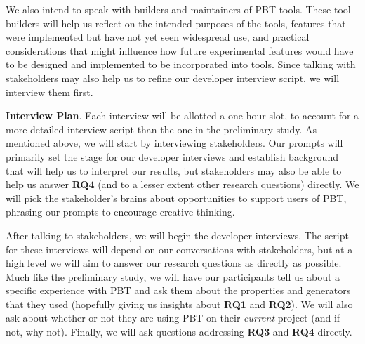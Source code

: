 We also intend to speak with builders and maintainers of PBT tools. These
tool-builders will help us reflect on the intended purposes of the tools,
features that were implemented but have not yet seen widespread use, and
practical considerations that might influence how future experimental features
would have to be designed and implemented to be incorporated into tools. Since talking with
stakeholders may also help us to refine our developer interview script, we will
interview them first.



\textbf{Interview Plan}.
Each interview will be allotted a one hour slot, to account for a more detailed
interview script than the one in the preliminary study. As mentioned above, we
will start by interviewing stakeholders. Our prompts will primarily set the
stage for our developer interviews and establish background that will help us to
interpret our results, but stakeholders may also be able to help us answer {\bf
RQ4} (and to a lesser extent other research questions) directly. We will pick
the stakeholder's brains about opportunities to support users
of PBT, phrasing our prompts to encourage creative thinking.

After talking to stakeholders, we will begin the developer interviews. The
script for these interviews will depend on our conversations with stakeholders,
but at a high level we will aim to answer our research questions as directly as
possible. Much like the preliminary study, we will have our participants tell us about a
specific experience with PBT and ask them about the properties and generators
that they used (hopefully giving us insights about {\bf RQ1} and {\bf RQ2}).  We
will also ask about whether or not they are using PBT on their {\em current}
project (and if not, why not). Finally, we will ask questions addressing
{\bf RQ3} and {\bf RQ4} directly.

